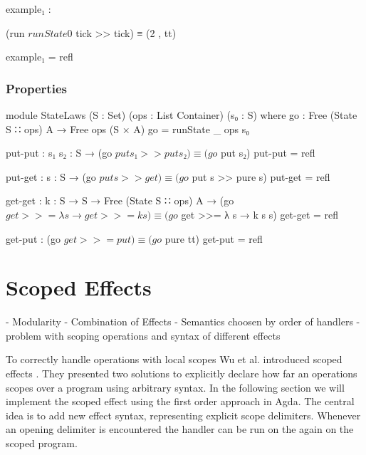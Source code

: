 \begin{center}
\begin{code}
example₁ :
\end{code}
\begin{code}[inline]
 (run $ runState 0 $ tick >> tick) ≡ (2 , tt)
\end{code}
\begin{code}
example₁ = refl
\end{code}
\end{center}

\subsubsection{Properties}

\begin{code}
module StateLaws (S : Set) (ops : List Container) (s₀ : S) where
  go : Free (State S ∷ ops) A → Free ops (S × A)
  go = runState {_} {ops} s₀

  put-put : {s₁ s₂ : S} → (go $ put s₁ >> put s₂) ≡ (go $ put s₂)
  put-put = refl

  put-get : {s : S} → (go $ put s >> get) ≡ (go $ put s >> pure s)
  put-get = refl

  get-get : {k : S → S → Free (State S ∷ ops) A}
    → (go $ get >>= λ s → get >>= k s) ≡ (go $ get >>= λ s → k s s)
  get-get = refl

  get-put : (go $ get >>= put) ≡ (go $ pure tt)
  get-put = refl
\end{code}


\section{Scoped Effects}

- Modularity
- Combination of Effects
- Semantics choosen by order of handlers
- problem with scoping operations and syntax of different effects

To correctly handle operations with local scopes Wu et al. introduced scoped
effects \cite{DBLP:conf/haskell/WuSH14}.
They presented two solutions to explicitly declare how far an operations scopes
over a program using arbitrary syntax.
In the following section we will implement the scoped effect
 using the first order approach in Agda.
The central idea is to add new effect syntax, representing explicit scope
delimiters.
Whenever an opening delimiter is encountered the handler can be run on the
again on the scoped program.


